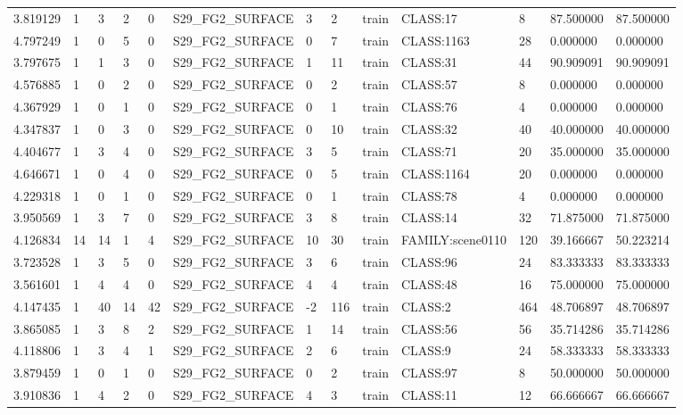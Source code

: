 \begin{tabular}{lllllllllllll}
3.819129 & 1 & 3 & 2 & 0 & S29\_FG2\_SURFACE & 3 & 2 & train & CLASS:17 & 8 & 87.500000 & 87.500000 \\
4.797249 & 1 & 0 & 5 & 0 & S29\_FG2\_SURFACE & 0 & 7 & train & CLASS:1163 & 28 & 0.000000 & 0.000000 \\
3.797675 & 1 & 1 & 3 & 0 & S29\_FG2\_SURFACE & 1 & 11 & train & CLASS:31 & 44 & 90.909091 & 90.909091 \\
4.576885 & 1 & 0 & 2 & 0 & S29\_FG2\_SURFACE & 0 & 2 & train & CLASS:57 & 8 & 0.000000 & 0.000000 \\
4.367929 & 1 & 0 & 1 & 0 & S29\_FG2\_SURFACE & 0 & 1 & train & CLASS:76 & 4 & 0.000000 & 0.000000 \\
4.347837 & 1 & 0 & 3 & 0 & S29\_FG2\_SURFACE & 0 & 10 & train & CLASS:32 & 40 & 40.000000 & 40.000000 \\
4.404677 & 1 & 3 & 4 & 0 & S29\_FG2\_SURFACE & 3 & 5 & train & CLASS:71 & 20 & 35.000000 & 35.000000 \\
4.646671 & 1 & 0 & 4 & 0 & S29\_FG2\_SURFACE & 0 & 5 & train & CLASS:1164 & 20 & 0.000000 & 0.000000 \\
4.229318 & 1 & 0 & 1 & 0 & S29\_FG2\_SURFACE & 0 & 1 & train & CLASS:78 & 4 & 0.000000 & 0.000000 \\
3.950569 & 1 & 3 & 7 & 0 & S29\_FG2\_SURFACE & 3 & 8 & train & CLASS:14 & 32 & 71.875000 & 71.875000 \\
4.126834 & 14 & 14 & 1 & 4 & S29\_FG2\_SURFACE & 10 & 30 & train & FAMILY:scene0110 & 120 & 39.166667 & 50.223214 \\
3.723528 & 1 & 3 & 5 & 0 & S29\_FG2\_SURFACE & 3 & 6 & train & CLASS:96 & 24 & 83.333333 & 83.333333 \\
3.561601 & 1 & 4 & 4 & 0 & S29\_FG2\_SURFACE & 4 & 4 & train & CLASS:48 & 16 & 75.000000 & 75.000000 \\
4.147435 & 1 & 40 & 14 & 42 & S29\_FG2\_SURFACE & -2 & 116 & train & CLASS:2 & 464 & 48.706897 & 48.706897 \\
3.865085 & 1 & 3 & 8 & 2 & S29\_FG2\_SURFACE & 1 & 14 & train & CLASS:56 & 56 & 35.714286 & 35.714286 \\
4.118806 & 1 & 3 & 4 & 1 & S29\_FG2\_SURFACE & 2 & 6 & train & CLASS:9 & 24 & 58.333333 & 58.333333 \\
3.879459 & 1 & 0 & 1 & 0 & S29\_FG2\_SURFACE & 0 & 2 & train & CLASS:97 & 8 & 50.000000 & 50.000000 \\
3.910836 & 1 & 4 & 2 & 0 & S29\_FG2\_SURFACE & 4 & 3 & train & CLASS:11 & 12 & 66.666667 & 66.666667 \\

\end{tabular}
